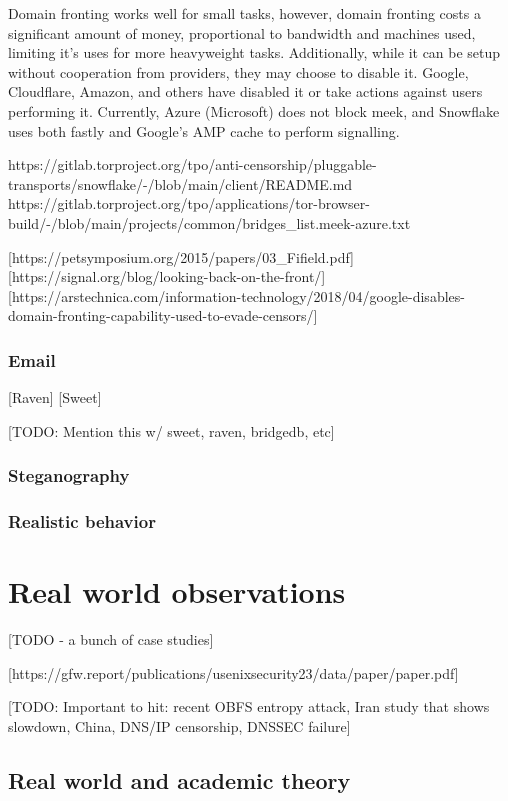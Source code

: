 \documentclass[12pt]{report}
\begin{document}
Domain fronting works well for small tasks, however, domain fronting costs a significant amount of money, proportional to bandwidth and machines used, limiting it's uses for more heavyweight tasks. Additionally, while it can be setup without cooperation from providers, they may choose to disable it. Google, Cloudflare, Amazon, and others have disabled it or take actions against users performing it. Currently, Azure (Microsoft) does not block meek, and Snowflake uses both fastly and Google's AMP cache to perform signalling.

https://gitlab.torproject.org/tpo/anti-censorship/pluggable-transports/snowflake/-/blob/main/client/README.md
https://gitlab.torproject.org/tpo/applications/tor-browser-build/-/blob/main/projects/common/bridges_list.meek-azure.txt

[https://petsymposium.org/2015/papers/03_Fifield.pdf]
[https://signal.org/blog/looking-back-on-the-front/]
[https://arstechnica.com/information-technology/2018/04/google-disables-domain-fronting-capability-used-to-evade-censors/]

\subsubsection{Email}

[Raven] [Sweet]

[TODO: Mention this w/ sweet, raven, bridgedb, etc]

\subsubsection{Steganography}

\subsubsection{Realistic behavior}

\section{Real world observations}
\label{real}

[TODO - a bunch of case studies]

[https://gfw.report/publications/usenixsecurity23/data/paper/paper.pdf]

[TODO: Important to hit: recent OBFS entropy attack, Iran study that shows slowdown, China, DNS/IP censorship, DNSSEC failure]

\subsection{Real world and academic theory}
\end{document}

